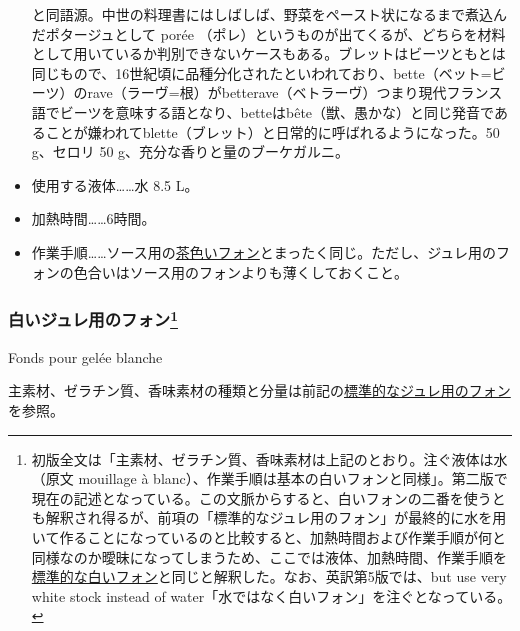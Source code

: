 \begin{recette}
\begin{itemize}
{    と同語源。中世の料理書にはしばしば、野菜をペースト状になるまで煮込んだポタージュとして
    porée
    （ポレ）というものが出てくるが、どちらを材料として用いているか判別できないケースもある。ブレットはビーツともとは同じもので、16世紀頃に品種分化されたといわれており、bette（ベット=ビーツ）のrave（ラーヴ=根）がbetterave（ベトラーヴ）つまり現代フランス語でビーツを意味する語となり、betteはbête（獣、愚かな）と同じ発音であることが嫌われてblette（ブレット）と日常的に呼ばれるようになった。}50
  g、セロリ 50 g、充分な香りと量のブーケガルニ。
\item
  使用する液体\ldots{}\ldots{}水 8.5 L。
\item
  加熱時間\ldots{}\ldots{}6時間。
\item
  作業手順\ldots{}\ldots{}ソース用の\protect\hyperlink{fonds-brun}{茶色いフォン}とまったく同じ。ただし、ジュレ用のフォンの色合いはソース用のフォンよりも薄くしておくこと。
\end{itemize}

\atoaki{}

\hypertarget{fonds-pour-gelee-blanche}{%
\subsubsection[白いジュレ用のフォン]{\texorpdfstring{白いジュレ用のフォン\footnote{初版全文は「主素材、ゼラチン質、香味素材は上記のとおり。注ぐ液体は水（原文
  mouillage à
  blanc）、作業手順は基本の白いフォンと同様」。第二版で現在の記述となっている。この文脈からすると、白いフォンの二番を使うとも解釈され得るが、前項の「標準的なジュレ用のフォン」が最終的に水を用いて作ることになっているのと比較すると、加熱時間および作業手順が何と同様なのか曖昧になってしまうため、ここでは液体、加熱時間、作業手順を\protect\hyperlink{fonds-blanc}{標準的な白いフォン}と同じと解釈した。なお、英訳第5版では、but
  use very white stock instead of
  water「水ではなく白いフォン」を注ぐとなっている。}}{白いジュレ用のフォン}}\label{fonds-pour-gelee-blanche}}

\begin{frsubenv}

Fonds pour gelée blanche

\end{frsubenv}


主素材、ゼラチン質、香味素材の種類と分量は前記の\protect\hyperlink{fonds-pour-gelee-ordinaire}{標準的なジュレ用のフォン}を参照。


\end{recette}

